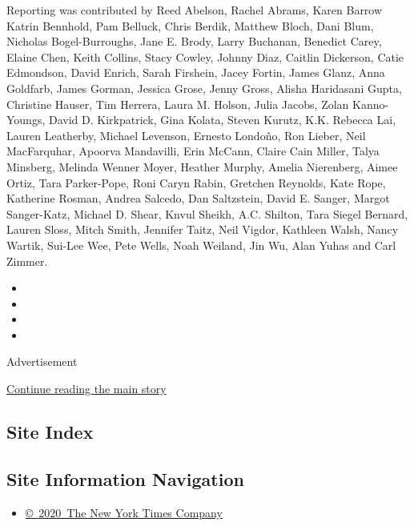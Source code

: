 Reporting was contributed by Reed Abelson, Rachel Abrams, Karen Barrow
Katrin Bennhold, Pam Belluck, Chris Berdik, Matthew Bloch, Dani Blum,
Nicholas Bogel-Burroughs, Jane E. Brody, Larry Buchanan, Benedict Carey,
Elaine Chen, Keith Collins, Stacy Cowley, Johnny Diaz, Caitlin
Dickerson, Catie Edmondson, David Enrich, Sarah Firshein, Jacey Fortin,
James Glanz, Anna Goldfarb, James Gorman, Jessica Grose, Jenny Gross,
Alisha Haridasani Gupta, Christine Hauser, Tim Herrera, Laura M. Holson,
Julia Jacobs, Zolan Kanno-Youngs, David D. Kirkpatrick, Gina Kolata,
Steven Kurutz, K.K. Rebecca Lai, Lauren Leatherby, Michael Levenson,
Ernesto Londoño, Ron Lieber, Neil MacFarquhar, Apoorva Mandavilli, Erin
McCann, Claire Cain Miller, Talya Minsberg, Melinda Wenner Moyer,
Heather Murphy, Amelia Nierenberg, Aimee Ortiz, Tara Parker-Pope, Roni
Caryn Rabin, Gretchen Reynolds, Kate Rope, Katherine Rosman, Andrea
Salcedo, Dan Saltzstein, David E. Sanger, Margot Sanger-Katz, Michael D.
Shear, Knvul Sheikh, A.C. Shilton, Tara Siegel Bernard, Lauren Sloss,
Mitch Smith, Jennifer Taitz, Neil Vigdor, Kathleen Walsh, Nancy Wartik,
Sui-Lee Wee, Pete Wells, Noah Weiland, Jin Wu, Alan Yuhas and Carl
Zimmer.

\begin{itemize}
\item
\item
\item
\item
\end{itemize}

Advertisement

\protect\hyperlink{after-bottom}{Continue reading the main story}

\hypertarget{site-index}{%
\subsection{Site Index}\label{site-index}}

\hypertarget{site-information-navigation}{%
\subsection{Site Information
Navigation}\label{site-information-navigation}}

\begin{itemize}
\tightlist
\item
  \href{https://help.nytimes3xbfgragh.onion/hc/en-us/articles/115014792127-Copyright-notice}{©~2020~The
  New York Times Company}
\end{itemize}

